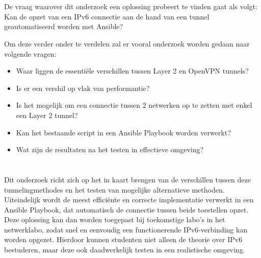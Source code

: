 \section{}%
\label{sec:onderzoeksvraag}

De vraag waarover dit onderzoek een oplossing probeert te vinden gaat als volgt:
Kan de opzet van een IPv6 connectie aan de hand van een tunnel geautomatiseerd worden met Ansible?

Om deze verder onder te verdelen zal er vooral onderzoek worden gedaan naar volgende vragen:
\begin{itemize}
    \item Waar liggen de essentiële verschillen tussen Layer 2 en OpenVPN tunnels?
    \item Is er een vershil op vlak van performantie?
    \item Is het mogelijk om een connectie tussen 2 netwerken op te zetten met enkel een Layer 2 tunnel?
    \item Kan het bestaande script in een Ansible Playbook worden verwerkt?
    \item Wat zijn de resultaten na het testen in effectieve omgeving?
\end{itemize}

\section{}%
\label{sec:onderzoeksdoelstelling}

Dit onderzoek richt zich op het in kaart brengen van de verschillen tussen deze tunnelingmethodes en het testen van mogelijke alternatieve methoden. 
Uiteindelijk wordt de meest efficiënte en correcte implementatie verwerkt in een Ansible Playbook, dat automatisch de connectie tussen beide toestellen opzet.
Deze oplossing kan dan worden toegepast bij toekomstige labo’s in het netwerklabo, zodat snel en eenvoudig een functionerende IPv6-verbinding kan worden opgezet. 
Hierdoor kunnen studenten niet alleen de theorie over IPv6 bestuderen, maar deze ook daadwerkelijk testen in een realistische omgeving.

\section{}%
\label{sec:opzet-bachelorproef}

